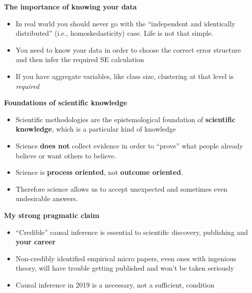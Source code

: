 \documentclass[notes=show]{beamer}
\begin{document}
\begin{frame}[plain]
\begin{center}
\textbf{The importance of knowing your data}
\end{center}

\begin{itemize}
\item In real world you should never go with the ``independent and identically distributed'' (i.e., homoskedasticity) case.  Life is not that simple.
\item You need to know your data in order to choose the correct error structure and then infer the required SE calculation
\item If you have aggregate variables, like class size, clustering at that level is \emph{required}
\end{itemize}

\end{frame}











\begin{frame}[plain]
	\begin{center}
	\textbf{Foundations of scientific knowledge}
	\end{center}
 
		\begin{itemize}
		\item Scientific methodologies are the epistemological foundation of \textbf{scientific knowledge}, which is a particular kind of knowledge
		    	\item Science \textbf{does not} collect evidence in order to ``prove'' what people already believe or want others to believe.
			\item Science is \textbf{process oriented}, not \textbf{outcome oriented}.
			\item Therefore science allows us to accept unexpected and sometimes even undesirable answers.
			\end{itemize}

\end{frame}


\begin{frame}[plain]
\begin{center}
\textbf{My strong pragmatic claim}
\end{center}

\begin{itemize}
	\item ``Credible'' causal inference is essential to scientific discovery, publishing and \textbf{your career}
	\item Non-credibly identified empirical micro papers, even ones with ingenious theory, will have trouble getting published and won't be taken seriously  
	\item Causal inference in 2019 is a necessary, not a sufficient, condition
\end{itemize}

\end{frame}
\end{document}
